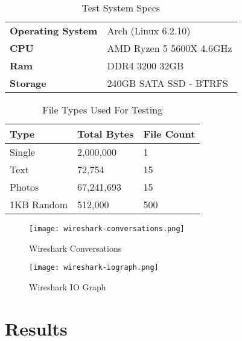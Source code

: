 \begin{table}[h!]
	\caption{Test System Specs}
	\label{tab:test-system-specs}
	\centering
	\begin{tabular}{ l | l | }
		\textbf{Operating System} & Arch (Linux 6.2.10)      \\
		\textbf{CPU}              & AMD Ryzen 5 5600X 4.6GHz \\
		\textbf{Ram}              & DDR4 3200 32GB           \\
		\textbf{Storage}          & 240GB SATA SSD - BTRFS   \\
	\end{tabular}
\end{table}

\begin{table}[h!]
	\caption{File Types Used For Testing}
	\label{tab:file-types-used-for-testing}
	\centering
	\begin{tabular}{ l l l }
		\textbf{Type} & \textbf{Total Bytes} & \textbf{File Count} \\
		\hline
		Single        & 2,000,000            & 1                   \\
		\hline
		Text          & 72,754               & 15                  \\
		\hline
		Photos        & 67,241,693           & 15                  \\
		\hline
		1KB Random    & 512,000              & 500                 \\
		\hline
	\end{tabular}
\end{table}

\begin{figure}[h!]
    \centering
    \texttt{[image: wireshark-conversations.png]}
    \caption{Wireshark Conversations}
\end{figure}

\begin{figure}[h!]
    \centering
    \texttt{[image: wireshark-iograph.png]}
    \caption{Wireshark IO Graph}
\end{figure}

\newpage

\section{Results}
